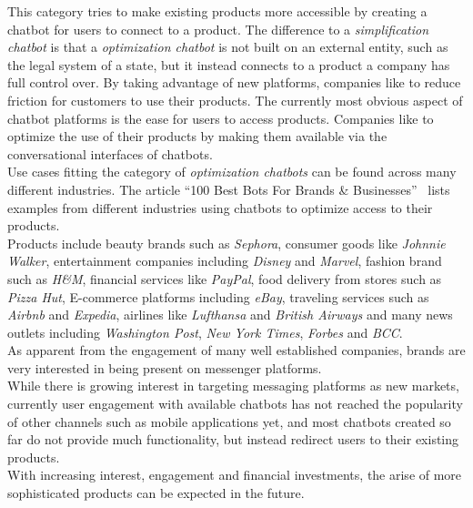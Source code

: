 This category tries to make existing products more accessible by creating a chatbot for users to connect to a product.
The difference to a \emph{simplification chatbot} is that a \emph{optimization chatbot} is not built on an external entity, such as the legal system of a state, but it instead connects to a product a company has full control over.
By taking advantage of new platforms, companies like to reduce friction for customers to use their products.
The currently most obvious aspect of chatbot platforms is the ease for users to access products.
Companies like to optimize the use of their products by making them available via the conversational interfaces of chatbots.
\\
Use cases fitting the category of \emph{optimization chatbots} can be found across many different industries.
The article ``100 Best Bots For Brands \& Businesses''~\cite{topbots} lists examples from different industries using chatbots to optimize access to their products.
\\
Products include beauty brands such as \emph{Sephora}, consumer goods like \emph{Johnnie Walker}, entertainment companies including \emph{Disney} and \emph{Marvel}, fashion brand such as \emph{H\&M}, financial services like \emph{PayPal}, food delivery from stores such as \emph{Pizza Hut}, E-commerce platforms including \emph{eBay}, traveling services such as \emph{Airbnb} and \emph{Expedia}, airlines like \emph{Lufthansa} and \emph{British Airways} and many news outlets including \emph{Washington Post}, \emph{New York Times}, \emph{Forbes} and \emph{BCC}.
\\


As apparent from the engagement of many well established companies, brands are very interested in being present on messenger platforms.
\\
While there is growing interest in targeting messaging platforms as new markets, currently user engagement with available chatbots has not reached the popularity of other channels such as mobile applications yet,
and most chatbots created so far do not provide much functionality, but instead redirect users to their existing products.
\\
With increasing interest, engagement and financial investments, the arise of more sophisticated products can be expected in the future.

